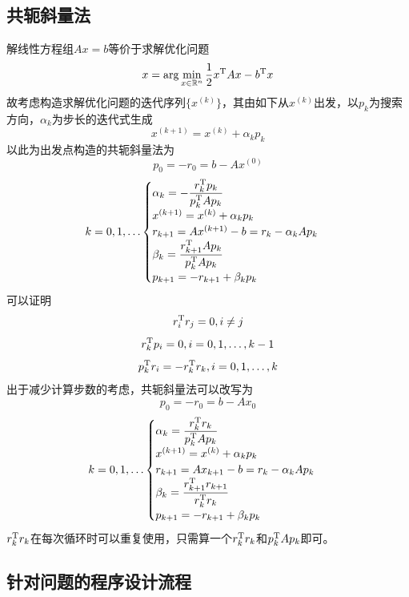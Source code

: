 \documentclass[UTF8,a4paper,10pt]{ctexart}
\begin{document}
        \subsection{共轭斜量法}
            \par
            解线性方程组$Ax=b$等价于求解优化问题
            $$
            x=\arg\min_{x\in\mathbb{R}^n}\dfrac{1}{2}x^{\rm{T}}Ax-b^{\rm{T}}x
            $$
            故考虑构造求解优化问题的迭代序列$\{x^{(k)}\}$，其由如下从$x^{(k)}$出发，以$p_k$为搜索方向，$\alpha_k$为步长的迭代式生成
            $$
            x^{(k+1)}=x^{(k)}+\alpha_kp_k
            $$
            以此为出发点构造的共轭斜量法为
            $$
            p_0=-r_0=b-Ax^{(0)}
            $$
            $$
            k=0,1,\dots
            \begin{cases}
                \alpha_k=-\dfrac{r_k^{\rm{T}}p_k}{p_k^{\rm{T}}Ap_k}\\
                x^{(k+1)}=x^{(k)}+\alpha_kp_k\\
                r_{k+1}=Ax^{(k+1)}-b=r_k-\alpha_kAp_k\\
                \beta_k=\dfrac{r_{k+1}^{\rm{T}}Ap_k}{p_k^{\rm{T}}Ap_k}\\
                p_{k+1}=-r_{k+1}+\beta_kp_k
            \end{cases}
            $$
            可以证明
            $$
            r_i^{\rm{T}}r_j=0,i\neq j
            $$
            $$
            r_k^{\rm{T}}p_i=0,i=0,1,\dots,k-1
            $$
            $$
            p_k^{\rm{T}}r_i=-r_k^{\rm{T}}r_k,i=0,1,\dots,k
            $$
            出于减少计算步数的考虑，共轭斜量法可以改写为
            $$
            p_0=-r_0=b-Ax_0
            $$
            $$
            k=0,1,\dots
            \begin{cases}
                \alpha_k=\dfrac{r_k^{\rm{T}}r_k}{p_k^{\rm{T}}Ap_k}\\
                x^{(k+1)}=x^{(k)}+\alpha_kp_k\\
                r_{k+1}=Ax_{k+1}-b=r_k-\alpha_kAp_k\\
                \beta_k=\dfrac{r_{k+1}^{\rm{T}}r_{k+1}}{r_k^{\rm{T}}r_k}\\
                p_{k+1}=-r_{k+1}+\beta_kp_k
            \end{cases}
            $$
            $r_k^{\rm{T}}r_k$在每次循环时可以重复使用，只需算一个$r_k^{\rm{T}}r_k$和$p_k^{\rm{T}}Ap_k$即可。
        \subsection{针对问题的程序设计流程}
\end{document}
